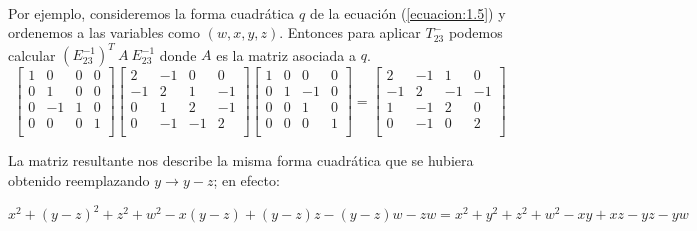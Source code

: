 \paragraph{}
Por ejemplo, consideremos la forma cuadrática $q$ de la ecuación (\ref{ecuacion:1.5}) y ordenemos a las variables como $(w,x,y,z)$. Entonces para aplicar $T_{23}^{-}$ podemos calcular $\left(E_{23}^{-1}\right)^{T}~A~E_{23}^{-1}$ donde $A$ es la matriz asociada a $q$.\\

\begin{equation*}
    \begin{bmatrix}
    1 &  0  & 0 & 0\\
    0 &  1  & 0 & 0\\
    0 & -1  & 1 & 0\\
    0 &  0  & 0 & 1\\
    \end{bmatrix} \begin{bmatrix}
     2 & -1 &   0 &   0\\
    -1 &  2 &   1 &  -1\\
     0 &  1 &   2 &  -1\\
     0 & -1 & -1 &    2\\
    \end{bmatrix} \begin{bmatrix}
    1 &  0  &    0 & 0\\
    0 &  1  &  -1  & 0\\
    0 &  0  &   1  & 0\\
    0 &  0  &   0  & 1\\
    \end{bmatrix} = 
    \begin{bmatrix}
     2 & -1 &  1 &    0\\
    -1 &  2 & -1 &  -1\\
     1 & -1 &  2 &    0\\
     0 & -1 &  0 &   2\\
    \end{bmatrix}
\end{equation*}

La matriz resultante nos describe la misma forma cuadrática que se hubiera obtenido reemplazando $y \rightarrow y - z $; en efecto:

\begin{equation*}
x^{2} + (y - z)^{2} + z^{2} + w^{2} - x(y - z) + (y - z)z  - (y - z)w - zw = x^{2} + y^{2} + z^{2} + w^{2} -xy +xz - yz -yw
\end{equation*}

